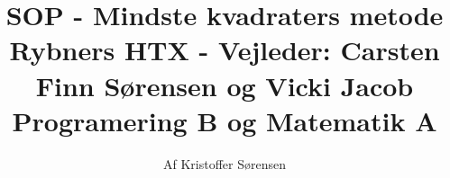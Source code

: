 \title{
    SOP - Mindste kvadraters metode \\ 
    \large{Rybners HTX - Vejleder: Carsten Finn Sørensen og Vicki Jacob} \\
    \small{Programering B og Matematik A}
}
\author{Af Kristoffer Sørensen}
\thispagestyle{empty}
\maketitle
\newpage